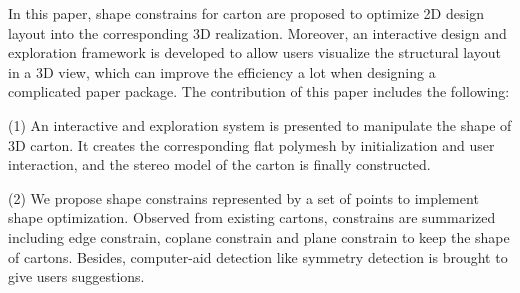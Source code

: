 
In this paper, shape constrains for carton are proposed to optimize 2D design layout into the corresponding 3D realization. Moreover, an interactive design and exploration framework is developed to allow users visualize the structural layout in a 3D view, which can improve the efficiency a lot when designing a complicated paper package. The contribution of this paper includes the following:

(1) An interactive and exploration system is presented to manipulate the shape of 3D carton. It creates the corresponding flat polymesh by initialization and user interaction, and the stereo model of the carton is finally constructed.

(2) We propose shape constrains represented by a set of points to implement shape optimization. Observed from existing cartons,  constrains are summarized including edge constrain, coplane constrain and plane constrain to keep the shape of cartons. Besides, computer-aid detection like symmetry detection is brought to give users suggestions. 